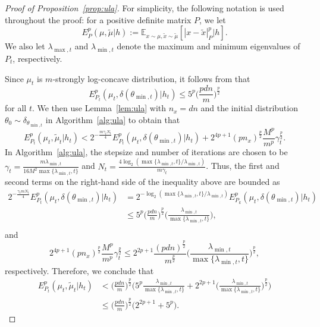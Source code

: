 \documentclass[11pt]{article}
\theoremstyle{plain}
\theoremstyle{definition}
\theoremstyle{remark}
\begin{document}
\begin{proof}[Proof of Proposition~\ref{prop:ula}]
For simplicity, the following notation
is used throughout the proof: for a positive definite matrix $P$, we let
\[
E^p_P (\mu, \tilde\mu | h) := \mathbb{E}_{x \sim \mu, \tilde x \sim \tilde\mu} [ | x - \tilde x|_P^p | h].
\]
We also let $\lambda_{\max,t}$ and $\lambda_{\min,t}$ denote the maximum and minimum eigenvalues of $P_t$, respectively.

Since $\mu_t$ is $m$-strongly log-concave distribution, 
it follows from \cite[Lemma 10]{mazumdar2020thompson} that 
\begin{equation}\label{eq:lem}
E^p_{P_t} ( \mu_t, \delta (\theta_{\min, t}) | h_{t}) \leq 5^p \bigg(\frac{pdn}{m}\bigg)^{\frac{p}{2}}
\end{equation}
for all $t$.
We then use Lemma~\ref{lem:ula} with $n_x = dn$ and 
the initial distribution $\theta_0 \sim \delta_ {\theta_{\min, t}}$ in Algorithm~\ref{alg:ula} 
to obtain that 
\[
E^p_{P_t}(\mu_{t}, \tilde{\mu}_{t}| h_{t}) < 2^{-\frac{m \gamma_t  N_t}{4}}
E^p_{P_t}(\mu_{t}, \delta(\theta_{\min, t})| h_{t}) + 
2^{4p+1} (pn_x)^{\frac{p}{2}} \frac{M^p}{m^p} \gamma_t^{\frac{p}{2}}.
\]
In Algorithm~\ref{alg:ula}, the stepsize and number of iterations are chosen to be 
$\gamma_t = \frac{m \lambda_{\min,t}}{16M^2\max\{\lambda_{\min,t},t\}}$ and $N_t = \frac{4\log_2 (\max\{\lambda_{\min,t},t\}/\lambda_{\min,t})}{m \gamma_t}$. 
Thus, the first and second terms on the right-hand side of  the inequality above are bounded as
\begin{equation}\nonumber
\begin{split}
2^{-\frac{\gamma_t m N_t}{4}}
E_{P_t}^p(\mu_{t}, \delta(\theta_{\min, t})| h_{t}) &= 
2^{-\log_2 (\max\{\lambda_{\min,t},t\}/\lambda_{\min,t})} E_{P_k}^p(\mu_{t}, \delta(\theta_{\min, t})| h_{t})\\
&\leq 5^p \bigg(\frac{pdn}{m}\bigg)^{\frac{p}{2}}
 \bigg(\frac{\lambda_{\min,t}}{\max\{\lambda_{\min,t},t\}}\bigg),\\
\end{split}
\end{equation}
and
\[
2^{4p+1} (pn_x)^{\frac{p}{2}} \frac{M^p}{m^p} \gamma_t^{\frac{p}{2}} \leq 
2^{2p+1} \frac{(pdn)^{\frac{p}{2}}}{m^{\frac{p}{2}}} \bigg(\frac{\lambda_{\min,t}}{\max\{\lambda_{\min,t},t\}}\bigg)^{\frac{p}{2}},
\]
respectively.
Therefore, we conclude that
\begin{align*}
E^p_{P_t}(\mu_{t}, \tilde{\mu}_{t}| h_{t}) &< \bigg(\frac{pdn}{m}\bigg)^{\frac{p}{2}}\bigg(5^{p}\frac{\lambda_{\min,t}}{\max\{\lambda_{\min,t},t\}}+2^{2p+1}\bigg(\frac{\lambda_{\min,t}}{\max\{\lambda_{\min,t},t\}}\bigg)^{\frac{p}{2}}  \bigg)\\
&\leq \bigg(\frac{pdn}{m}\bigg)^{\frac{p}{2}}\big(2^{2p+1}+5^{p}\big).
\end{align*}


\end{proof}
\end{document}
